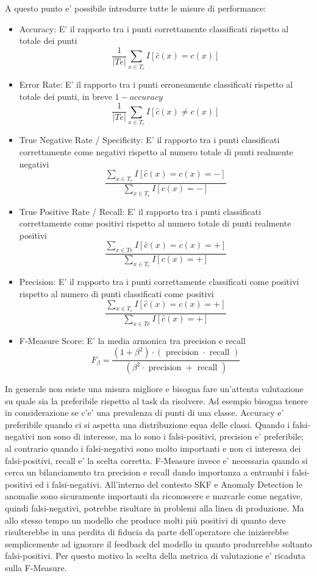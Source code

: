 A questo punto e' possibile introdurre tutte le misure di performance:
\begin{itemize}
\item Accuracy: E' il rapporto tra i punti correttamente classificati rispetto al totale dei punti 
\[\frac{1}{|Te|} \sum_{x \in T_e} I[\hat{c}(x)=c(x)]\]
\item Error Rate: E' il rapporto tra i punti erroneamente classificati rispetto al totale dei punti, in breve \(1-accuracy\) 
\[\frac{1}{|Te|} \sum_{x \in T_e} I[\hat{c}(x)\neq c(x)]\]
\item True Negative Rate / Specificity: E' il rapporto tra i punti classificati correttamente come negativi rispetto al numero totale di punti realmente negativi
\[\frac{\sum_{x \in T_e} I[\hat{c}(x)=c(x)=-]}{\sum_{x \in T_e} I[c(x)=-]}\]
\item True Positive Rate / Recall: E' il rapporto tra i punti classificati correttamente come positivi rispetto al numero totale di punti realmente positivi
\[\frac{\sum_{x \in T e} I[\hat{c}(x)=c(x)=+]}{\sum_{x \in T_e} I[c(x)=+]}\]
\item Precision: E' il rapporto tra i punti correttamente classificati come positivi rispetto al numero di punti classificati come positivi
\[\frac{\sum_{x \in T_c} I[\hat{c}(x)=c(x)=+]}{\sum_{x \in T e} I[\hat{c}(x)=+]}\]
\item F-Measure Score: E' la media armonica tra precision e recall
\[F_\beta=\frac{\left(1+\beta^2\right) \cdot(\text { precision } \cdot \text { recall })}{\left(\beta^2 \cdot \text { precision }+\text { recall }\right)}\]
\end{itemize}

In generale non esiste una misura migliore e bisogna fare un'attenta valutazione su quale sia la preferibile rispetto al task da risolvere.
Ad esempio bisogna tenere in considerazione se c'e' una prevalenza di punti di una classe. Accuracy e' preferibile quando ci si aspetta una distribuzione equa delle classi. Quando i falsi-negativi non sono di interesse, ma lo sono i falsi-positivi, precision e' preferibile; al contrario quando i falsi-negativi sono molto importanti e non ci interessa dei falsi-positivi, recall e' la scelta corretta.
F-Measure invece e' necessaria quando si cerca un bilanciamento tra precision e recall dando importanza a entrambi i falsi-positivi ed i falsi-negativi. 
All'interno del contesto SKF e Anomaly Detection le anomalie sono sicuramente importanti da riconoscere e marcarle come negative, quindi falsi-negativi, potrebbe risultare in problemi alla linea di produzione. Ma allo stesso tempo un modello che produce molti più positivi di quanto deve risulterebbe in una perdita di fiducia da parte dell'operatore che inizierebbe semplicemente ad ignorare il feedback del modello in quanto produrrebbe soltanto falsi-positivi. Per questo motivo la scelta della metrica di valutazione e' ricaduta sulla F-Measure.



